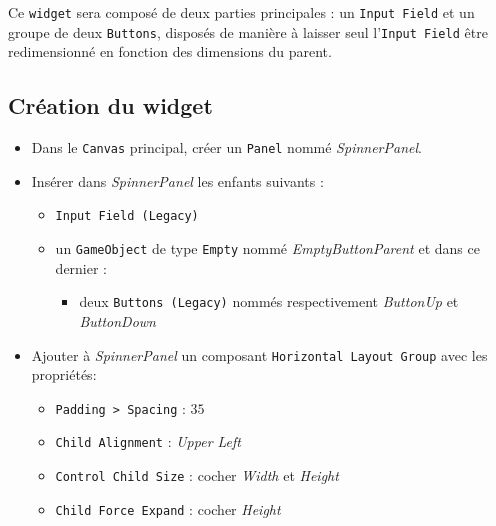 \documentclass[a4paper,10pt]{article}
\newenvironment{solution}%
{\begin{tcolorbox}[breakable,colback=red!5!white,colframe=red!75!black,title=Solution]}%
{\end{tcolorbox}}
\begin{document}
\ifversionenseignant
\begin{solution}
Ce \texttt{widget} sera composé de deux parties principales : un \texttt{Input Field} et un groupe de deux \texttt{Buttons}, disposés de manière à  laisser seul l'\texttt{Input Field} être redimensionné en fonction des dimensions du parent.	

\subsection{Création du widget}
\begin{itemize}
	\item Dans le \texttt{Canvas} principal, créer un \texttt{Panel} nommé \textit{SpinnerPanel}.
	\item Insérer dans \textit{SpinnerPanel} les enfants suivants :
	\begin{itemize}
		\item \texttt{Input Field (Legacy)}
		\item un \texttt{GameObject} de type \texttt{Empty} nommé \textit{EmptyButtonParent} et dans ce dernier :
		\begin{itemize}
			\item deux \texttt{Buttons (Legacy)} nommés respectivement \textit{ButtonUp} et \textit{ButtonDown}
		\end{itemize}	
	\end{itemize}	
	
	\item Ajouter à \textit{SpinnerPanel} un composant \texttt{Horizontal Layout Group} avec les propriétés:
	\begin{itemize}
		\item \texttt{Padding > Spacing} : $35$
		\item \texttt{Child Alignment} : \textit{Upper Left}
		\item \texttt{Control Child Size} : cocher \textit{Width} et \textit{Height}
		\item \texttt{Child Force Expand} : cocher \textit{Height}
	\end{itemize}	


\end{itemize}
\end{solution}
\end{document}
